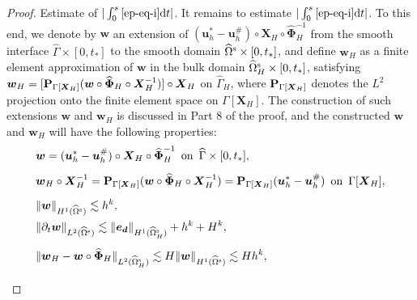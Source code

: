 \documentclass[11pt,reqno]{amsart}
\theoremstyle{definition}
\theoremstyle{plain}
\numberwithin{theorem}{section}
\numberwithin{proposition}{section}
\numberwithin{lemma}{section}
\numberwithin{equation}{section}
\newcommand{\bs}[1]{\boldsymbol{#1}}
\def\d{\mathrm{d}}
\newcommand{\bw}{{\bs w}}
\renewcommand{\(}{\bigl(}
\renewcommand{\)}{\bigr)}
\begin{document}
\begin{proof}
 Estimate of $|\int_0^s \eqref{ep-eq-i} \d t|$. It remains to estimate $|\int_0^s \eqref{ep-eq-i} \d t|$. To this end, we denote by ${\bs w}$ an extension of $({\bs u}_h^*-{\bs u}_h^\#)\circ {\bs X}_H \circ \widehat{\bs\Phi}_H^{-1}$ from the smooth interface $\widehat\Gamma\times[0,t_*]$ to the smooth domain $\widehat{\Omega}^{\rm s}\times[0,t_*]$, and define ${\bs w}_H$ as a finite element approximation of ${\bs w}$ in the bulk domain $\widehat{\Omega}^{\rm s}_H\times[0,t_*]$, satisfying ${\bs w}_H = [{\bf P}_{\Gamma[{\bs X}_H]}({\bs w}\circ \widehat{\bs\Phi}_H\circ {\bs X}_H^{-1})] \circ {\bs X}_H $ on $\widehat\Gamma_H$, where ${\bf P}_{\Gamma[{\bs X}_H]}$ denotes the $L^2$ projection onto the finite element space on $\Gamma[{\bs X}_H]$. The construction of such extensions ${\bs w}$ and ${\bs w}_H$ is discussed in Part 8 of the proof, and the constructed ${\bs w}$ and ${\bs w}_H$ will have the following properties: 
\begin{subequations}\label{def-w-wH}
\begin{align}
&{\bs w}=({\bs u}_h^*-{\bs u}_h^\#)\circ {\bs X}_H \circ \widehat{\bs\Phi}_H^{-1}\,\,\,\mbox{on}\,\,\,\widehat\Gamma \times [0,t_*], \label{def-w-w}\\[5pt]
&{\bs w}_H \circ {\bs X}_H^{-1} = {\bf P}_{\Gamma[{\bs X}_H]}({\bs w}\circ \widehat{\bs\Phi}_H\circ {\bs X}_H^{-1}) 
= {\bf P}_{\Gamma[{\bs X}_H]}({\bs u}_h^*-{\bs u}_h^\#) \,\,\,\mbox{on}\,\,\,\Gamma[{\bs X}_H], \label{def-wH-wH}\\[5pt]
& \|\bw\|_{H^1(\widehat{\Omega}^{\rm s})} \lesssim h^k , \label{estimate-w-wH-1} \\
&\|\partial_t\bw\|_{L^2(\widehat{\Omega}^{\rm s})} 
\lesssim \|{\bs e}_{\bs d}\|_{H^1(\widehat\Omega^{\rm s}_H)}
+ h^k + H^k , \label{estimate-dtw-L2}\\[5pt]
& \|\bw_H-\bw\circ\widehat{\bs\Phi}_H\|_{L^2(\widehat{\Omega}_H^{\rm s})}
\lesssim H \|\bw\|_{H^1(\widehat{\Omega}^{\rm s})} 
\lesssim Hh^k , \label{estimate-w-wH-2}\\[5pt]

\end{align}
\end{subequations}
\end{proof}
\end{document}
